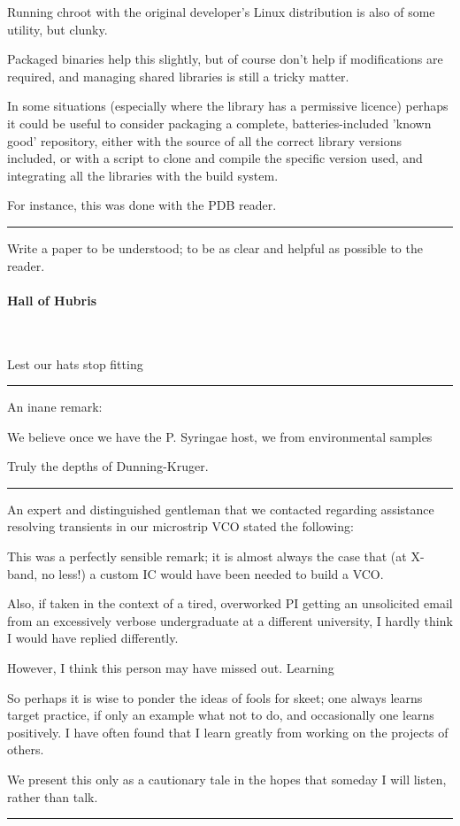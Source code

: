 \documentclass[fleqn,10pt]{article}
\begin{document}
\begin{multicols}{1}
Running chroot with the original developer's Linux distribution is also of some utility, but clunky. 

Packaged binaries help this slightly, but of course don't help if modifications are required, and managing shared libraries is still a tricky matter.

In some situations (especially where the library has a permissive licence) perhaps it could be useful to consider packaging a complete, batteries-included 'known good' repository, either with the source of all the correct library versions included, or with a script to clone and compile the specific version used, and integrating all the libraries with the build system. 

For instance, this was done with the PDB reader. 

\rule{\linewidth}{0.2pt}


Write a paper to be understood; to be as clear and helpful as possible to the reader.

\paragraph{Hall of Hubris} \

Lest our hats stop fitting

\rule{\linewidth}{0.2pt}

An inane remark:

\begin{displayquote}
We believe once we have the P. Syringae host, we from environmental samples
\end{displayquote}

Truly the depths of Dunning-Kruger.

\rule{\linewidth}{0.2pt}

An expert and distinguished gentleman that we contacted regarding assistance resolving transients in our microstrip VCO stated the following:



This was a perfectly sensible remark; it is almost always the case that (at X-band, no less!) a custom IC would have been needed to build a VCO.

Also, if taken in the context of a tired, overworked PI getting an unsolicited email from an excessively verbose undergraduate at a different university, I hardly think I would have replied differently.

However, I think this person may have missed out. Learning 

So perhaps it is wise to ponder the ideas of fools for skeet; one always learns target practice, if only an example what not to do, and occasionally one learns positively. I have often found that I learn greatly from working on the projects of others.

We present this only as a cautionary tale in the hopes that someday I will listen, rather than talk.

\rule{\linewidth}{0.2pt}

\end{multicols}

\end{document}
